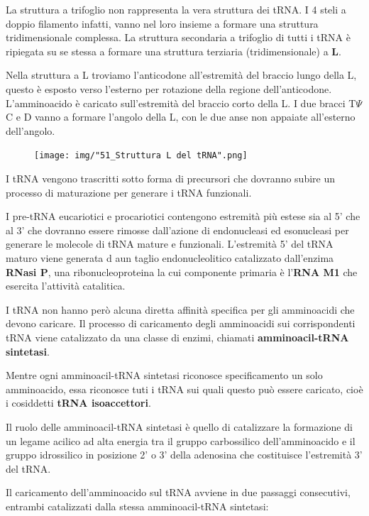 \documentclass[11pt]{book}
\begin{document}
La struttura a trifoglio non rappresenta la vera struttura dei tRNA. I 4
steli a doppio filamento infatti, vanno nel loro insieme a formare una
struttura tridimensionale complessa. La struttura secondaria a trifoglio
di tutti i tRNA è ripiegata su se stessa a formare una struttura
terziaria (tridimensionale) a \textbf{L}.

Nella struttura a L troviamo l'anticodone all'estremità del braccio
lungo della L, questo è esposto verso l'esterno per rotazione della
regione dell'anticodone. L'amminoacido è caricato sull'estremità del
braccio corto della L. I due bracci T\(\Psi\)C e D vanno a formare
l'angolo della L, con le due anse non appaiate all'esterno dell'angolo.

\begin{figure}[htp]
\centering
\texttt{[image: img/"51\_Struttura L del tRNA".png]}
\caption{}
\label{struttura-l-del-trna}
\end{figure}

I tRNA vengono trascritti sotto forma di precursori che dovranno subire
un processo di maturazione per generare i tRNA funzionali.

I pre-tRNA eucariotici e procariotici contengono estremità più estese
sia al 5' che al 3' che dovranno essere rimosse dall'azione di
endonucleasi ed esonucleasi per generare le molecole di tRNA mature e
funzionali. L'estremità 5' del tRNA maturo viene generata d aun taglio
endonucleolitico catalizzato dall'enzima \textbf{RNasi P}, una
ribonucleoproteina la cui componente primaria è l'\textbf{RNA M1} che
esercita l'attività catalitica.

I tRNA non hanno però alcuna diretta affinità specifica per gli
amminoacidi che devono caricare. Il processo di caricamento degli
amminoacidi sui corrispondenti tRNA viene catalizzato da una classe di
enzimi, chiamati \textbf{amminoacil-tRNA sintetasi}.

Mentre ogni amminoacil-tRNA sintetasi riconosce specificamento un solo
amminoacido, essa riconosce tuti i tRNA sui quali questo può essere
caricato, cioè i cosiddetti \textbf{tRNA isoaccettori}.

Il ruolo delle amminoacil-tRNA sintetasi è quello di catalizzare la
formazione di un legame acilico ad alta energia tra il gruppo
carbossilico dell'amminoacido e il gruppo idrossilico in posizione 2' o
3' della adenosina che costituisce l'estremità 3' del tRNA.

Il caricamento dell'amminoacido sul tRNA avviene in due passaggi
consecutivi, entrambi catalizzati dalla stessa amminoacil-tRNA
sintetasi:
\end{document}
